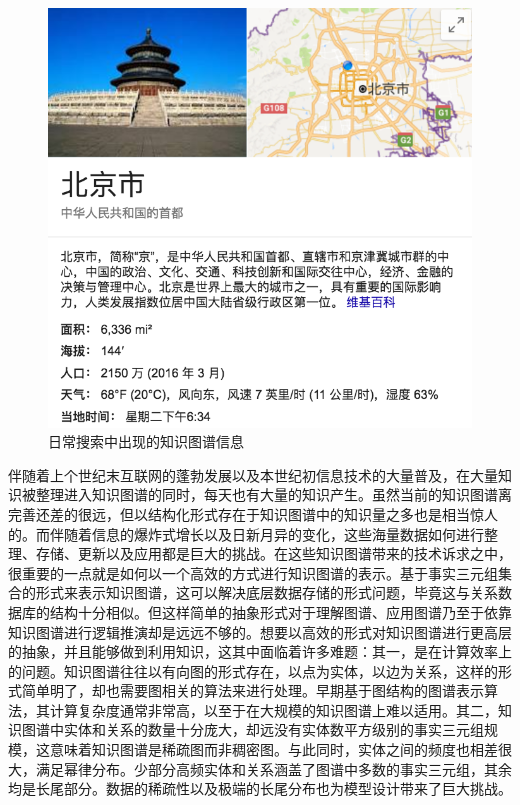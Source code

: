 \vspace{25pt}
\begin{figure}[h]
\setlength{\abovecaptionskip}{30pt} 
\centering
\includegraphics[width=0.6\columnwidth]{figures/ch1/knowledge.png}
\caption{日常搜索中出现的知识图谱信息}
\label{ch1:google_kg_example}
\end{figure}

伴随着上个世纪末互联网的蓬勃发展以及本世纪初信息技术的大量普及，在大量知识被整理进入知识图谱的同时，每天也有大量的知识产生。虽然当前的知识图谱离完善还差的很远，但以结构化形式存在于知识图谱中的知识量之多也是相当惊人的。而伴随着信息的爆炸式增长以及日新月异的变化，这些海量数据如何进行整理、存储、更新以及应用都是巨大的挑战。在这些知识图谱带来的技术诉求之中，很重要的一点就是如何以一个高效的方式进行知识图谱的表示。基于事实三元组集合的形式来表示知识图谱，这可以解决底层数据存储的形式问题，毕竟这与关系数据库的结构十分相似。但这样简单的抽象形式对于理解图谱、应用图谱乃至于依靠知识图谱进行逻辑推演却是远远不够的。想要以高效的形式对知识图谱进行更高层的抽象，并且能够做到利用知识，这其中面临着许多难题：其一，是在计算效率上的问题。知识图谱往往以有向图的形式存在，以点为实体，以边为关系，这样的形式简单明了，却也需要图相关的算法来进行处理。早期基于图结构的图谱表示算法，其计算复杂度通常非常高，以至于在大规模的知识图谱上难以适用。其二，知识图谱中实体和关系的数量十分庞大，却远没有实体数平方级别的事实三元组规模，这意味着知识图谱是稀疏图而非稠密图。与此同时，实体之间的频度也相差很大，满足幂律分布。少部分高频实体和关系涵盖了图谱中多数的事实三元组，其余均是长尾部分。数据的稀疏性以及极端的长尾分布也为模型设计带来了巨大挑战。

